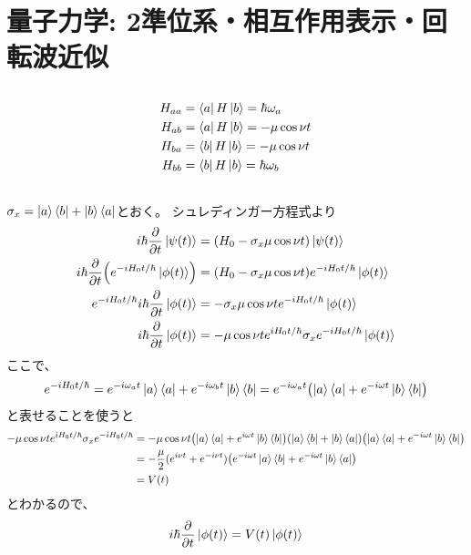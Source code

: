 \documentclass[../../master.tex]{subfiles}
\begin{document}
\chapter{量子力学: 2準位系・相互作用表示・回転波近似}
\section{}
\begin{equation}\begin{aligned}[b]
    H_{aa} &= \bra{a}H\ket{b} = \hbar \omega_a\\
    H_{ab} &= \bra{a}H\ket{b} = -\mu\cos\nu t\\
    H_{ba} &= \bra{b}H\ket{b} = -\mu\cos\nu t\\
    H_{bb} &= \bra{b}H\ket{b} = \hbar \omega_b
\end{aligned}\end{equation}
\section{}
\(\sigma_x = \ket{a}\bra{b}+\ket{b}\bra{a}\)とおく。
シュレディンガー方程式より
\begin{equation}\begin{aligned}[b]
    i\hbar\pdv{t}\ket{\psi(t)} &= \qty(H_0-\sigma_x\mu\cos\nu t)\ket{\psi(t)}\\
    i\hbar\pdv{t}\qty(e^{-iH_0t/\hbar}\ket{\phi(t)}) &= \qty(H_0-\sigma_x\mu\cos\nu t)e^{-iH_0t/\hbar}\ket{\phi(t)}\\
    e^{-iH_0t/\hbar}i\hbar\pdv{t}\ket{\phi(t)} &= -\sigma_x\mu\cos\nu t e^{-iH_0t/\hbar}\ket{\phi(t)}\\
    i\hbar\pdv{t}\ket{\phi(t)} &= -\mu\cos\nu t e^{iH_0t/\hbar}\sigma_x e^{-iH_0t/\hbar}\ket{\phi(t)}
\end{aligned}\end{equation}
ここで、
\begin{equation}\begin{aligned}[b]
    e^{-iH_0t/\hbar}
    = e^{-i\omega_a t}\ket{a}\bra{a}+e^{-i\omega_b t}\ket{b}\bra{b}
    = e^{-i\omega_a t}\qty(\ket{a}\bra{a}+e^{-i\omega t}\ket{b}\bra{b})
\end{aligned}\end{equation}
と表せることを使うと
\begin{equation}\begin{aligned}[b]
    -\mu\cos\nu t e^{iH_0t/\hbar}\sigma_x e^{-iH_0t/\hbar}
    &= -\mu\cos\nu t \qty(\ket{a}\bra{a}+e^{i\omega t}\ket{b}\bra{b})(\ket{a}\bra{b}+\ket{b}\bra{a})
        \qty(\ket{a}\bra{a}+e^{-i\omega t}\ket{b}\bra{b})\\
    &= -\frac{\mu}{2}(e^{i\nu t}+e^{-i\nu t})\qty(e^{-i\omega t}\ket{a}\bra{b}+e^{-i\omega t}\ket{b}\bra{a})\\
    &= V(t)
\end{aligned}\end{equation}
とわかるので、
\begin{equation}\begin{aligned}[b]
    i\hbar\pdv{t}\ket{\phi(t)} = V(t)\ket{\phi(t)}
\end{aligned}\end{equation}
\end{document}
